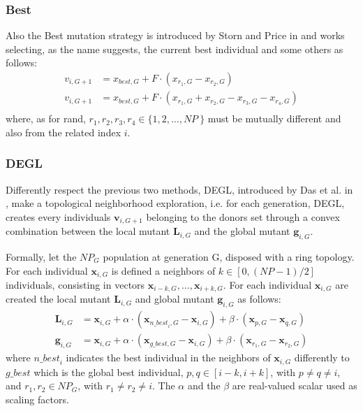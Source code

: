 \subsubsection{Best}
Also the Best mutation strategy is introduced by Storn and Price in \cite{DESEHGOCS:1997} and works selecting, as the name suggests, the current best individual and some others as follows:
\begin{align}
	v_{i, G + 1} &= x_{\textit{best}, G} + F \cdot (x_{r_1, G} - x_{r_2, G}) \\
	v_{i, G + 1} &= x_{\textit{best}, G} + F \cdot (x_{r_1, G} + x_{r_2, G} - x_{r_3, G} - x_{r_4, G}) \\
\end{align}
where, as for rand, $r_1, r_2, r_3, r_4 \in \{1, 2, \dots, \textit{NP}\ \}$ must be mutually different and also from the related index $i$.

\subsubsection{DEGL}
Differently respect the previous two methods, DEGL, introduced by Das et al. in \cite{DEGL:2009}, make a topological neighborhood exploration, i.e. for each generation, DEGL, creates every individuals $\textbf{v}_{i, G + 1}$ belonging to the donors set through a convex combination between the local mutant $\textbf{L}_{i, G}$ and the global mutant $\textbf{g}_{i, G}$.  


Formally, let the $\textit{NP}_G$ population at generation G, disposed with a ring topology. For each individual $\textbf{x}_{i, G}$ is defined a neighbors of $k \in [0, (\textit{NP} - 1) / 2]$ individuals, consisting in vectors $\textbf{x}_{i - k, G}, \dots, \textbf{x}_{i + k, G}$. 
For each individual $\textbf{x}_{i, G}$ are created the local mutant $\textbf{L}_{i, G}$ and global mutant $\textbf{g}_{i, G}$ as follows:
\begin{align}
	\textbf{L}_{i, G} &= \textbf{x}_{i, G} + \alpha \cdot (\textbf{x}_{\textit{n\_best}_i, G} - \textbf{x}_{i, G}) + \beta \cdot (\textbf{x}_{p, G} - \textbf{x}_{q, G}) \\
	\textbf{g}_{i, G} &= \textbf{x}_{i, G} + \alpha \cdot (\textbf{x}_{\textit{g\_best}, G} - \textbf{x}_{i, G}) + \beta \cdot (\textbf{x}_{r_1, G} - \textbf{x}_{r_2, G})
\end{align}
where $\textit{n\_best}_i$ indicates the best individual in the neighbors of $\textbf{x}_{i, G}$ differently to $\textit{g\_best}$ which is the global best individual, $p, q \in [i - k, i + k]$,  with $p \neq q \neq i$, and $r_1, r_2 \in NP_{G}$, with $r_1 \neq r_2 \neq i$. The $\alpha$ and the $\beta$ are real-valued scalar used as scaling factors.

